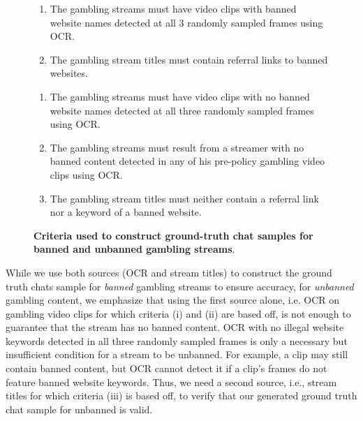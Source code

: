 \documentclass[a4paper,12pt]{article}
\begin{document}
\begin{figure}[h!]
\centering
\begin{minipage}[t]{0.49\textwidth}\vspace{0pt}%
\begin{promptblockfixed}
\begin{enumerate}[label=(\roman*), leftmargin=*]
\item The gambling streams must have video clips with banned website names detected at all 3 randomly sampled frames using OCR.
\item The gambling stream titles must contain referral links to banned websites.
\end{enumerate}
\end{promptblockfixed}
\end{minipage}\hfill
\begin{minipage}[t]{0.49\textwidth}\vspace{0pt}%
\begin{promptblockfixed}
\begin{enumerate}[label=(\roman*), leftmargin=*]
\item The gambling streams must have video clips with no banned website names detected at all three randomly sampled frames using OCR.
\item The gambling streams must result from a streamer with no banned content detected in any of his pre-policy gambling video clips using OCR.
\item The gambling stream titles must neither contain a referral link nor a keyword of a banned website.
\end{enumerate}
\end{promptblockfixed}
\end{minipage}
\caption{\textbf{Criteria used to construct ground-truth chat samples for banned and unbanned gambling streams}.}
\label{table-gambling-stream-criteria}
\end{figure}




While we use both sources (OCR and stream titles) to construct the ground truth chats sample for \textit{banned} gambling streams to ensure accuracy, for \textit{unbanned} gambling content, we emphasize that using the first source alone, i.e. OCR on gambling video clips for which criteria (i) and (ii) are based off, is not enough to guarantee that the stream has no banned content. OCR with no illegal website keywords detected in all three randomly sampled frames is only a necessary but insufficient condition for a stream to be unbanned. For example, a clip may still contain banned content, but OCR cannot detect it if a clip's frames do not feature banned website keywords. Thus, we need a second source, i.e., stream titles for which criteria (iii) is based off, to verify that our generated ground truth chat sample for unbanned is valid.
\end{document}
